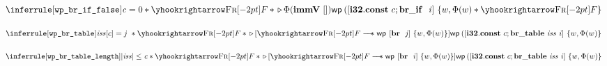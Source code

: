 \documentclass{standalone}
\begin{document}
\[ \inferrule[\texttt{wp\_br\_if\_false}]{
  \V{c} = 0 \ast{} \frameR{F} \ast{} \later \Phi(\immV{[]})
}{
  \wpre{(\left[\xxWeconstt{\xxWithirtytwo}{c}; \xxWbrif~\V{i}\right]}{w, \Phi(w)\ast{}\frameR F}
} \]


\[ \inferrule[\texttt{wp\_br\_table}]{
  \V{iss}[c] = \V{j} \ \ast{} \frameR{F} \ast{}
  \later\left[ \frameR{F} \wand \wpre{\left[\xxWbr~\V{j}\right]}{w, \Phi(w)}\right]
}{
  \wpre{(\left[\xxWeconstt{\xxWithirtytwo}{c}; \xxWbrtable~\V{iss}~\V{i}\right]}{w, \Phi(w)}
} \]


\[ \inferrule[\texttt{wp\_br\_table\_length}]{
  |\V{iss}| \leq \V{c} \ast{} \frameR{F} \ast{}
  \later\left[ \frameR{F} \wand \wpre{\left[\xxWbr~\V{i}\right]}{w, \Phi(w)}\right]
}{
  \wpre{(\left[\xxWeconstt{\xxWithirtytwo}{c}; \xxWbrtable~\V{iss}~\V{i}\right]}{w, \Phi(w)}
} \]



\end{document}
